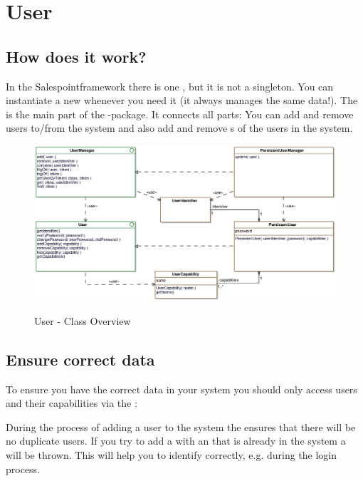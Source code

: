 \newpage
\section{User}

\subsection{How does it work?}

In the Salespointframework there is one , but it is not a singleton. You can instantiate a new
 whenever you need it (it always manages the same data!).
The  is the main part of the -package. It connects all parts:
You can add and remove users to/from the system and also add and remove s of the users in the system.

\begin{figure}[ht]
	\centering
  \includegraphics[width=1.0\textwidth]{images/User_Overview.eps}
	\label{user_overview}
	\caption{User - Class Overview}
\end{figure}

\subsection{Ensure correct data}
To ensure you have the correct data in your system you should only access users and their capabilities via the :

During the process of adding a user to the system the  ensures that there will be no duplicate users. If you try to add a  with an  that is already in the system a  will be thrown. This will help you to identify  correctly, e.g. during the login process.

